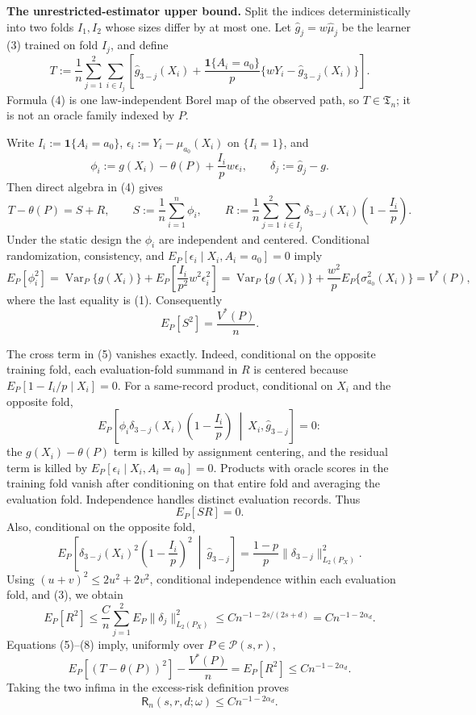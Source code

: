 \textbf{The unrestricted-estimator upper bound.}
Split the indices deterministically into two folds \(I_1,I_2\) whose sizes differ by at most one.  Let \(\widehat g_j=w\widehat\mu_j\) be the learner (3) trained on fold \(I_j\), and define
\[
T:=\frac1n\sum_{j=1}^2\sum_{i\in I_j}
\left[
\widehat g_{3-j}(X_i)
+\frac{\mathbf 1\{A_i=a_0\}}{p}
\{wY_i-\widehat g_{3-j}(X_i)\}
\right].
\tag{4}
\]
Formula (4) is one law-independent Borel map of the observed path, so \(T\in\mathfrak T_n\); it is not an oracle family indexed by \(P\).

Write \(I_i:=\mathbf 1\{A_i=a_0\}\), \(\epsilon_i:=Y_i-\mu_{a_0}(X_i)\) on \(\{I_i=1\}\), and
\[
\phi_i:=g(X_i)-\theta(P)+\frac{I_i}{p}w\epsilon_i,
\qquad
\delta_j:=\widehat g_j-g.
\]
Then direct algebra in (4) gives
\[
T-\theta(P)=S+R,
\qquad
S:=\frac1n\sum_{i=1}^n\phi_i,
\qquad
R:=\frac1n\sum_{j=1}^2\sum_{i\in I_j}
\delta_{3-j}(X_i)\left(1-\frac{I_i}{p}\right).
\tag{5}
\]
Under the static design the \(\phi_i\) are independent and centered.  Conditional randomization, consistency, and \(E_P[\epsilon_i\mid X_i,A_i=a_0]=0\) imply
\[
E_P[\phi_i^2]
=\operatorname{Var}_P\{g(X_i)\}
+E_P\left[\frac{I_i}{p^2}w^2\epsilon_i^2\right]
=\operatorname{Var}_P\{g(X_i)\}
+\frac{w^2}{p}E_P\{\sigma_{a_0}^2(X_i)\}
=V^*(P),
\]
where the last equality is (1).  Consequently
\[
E_P[S^2]=\frac{V^*(P)}{n}.
\tag{6}
\]

The cross term in (5) vanishes exactly.  Indeed, conditional on the opposite training fold, each evaluation-fold summand in \(R\) is centered because \(E_P[1-I_i/p\mid X_i]=0\).  For a same-record product, conditional on \(X_i\) and the opposite fold,
\[
E_P\left[
\phi_i\delta_{3-j}(X_i)\left(1-\frac{I_i}{p}\right)
\ \middle|\ X_i,\widehat g_{3-j}
\right]=0:
\]
the \(g(X_i)-\theta(P)\) term is killed by assignment centering, and the residual term is killed by \(E_P[\epsilon_i\mid X_i,A_i=a_0]=0\).  Products with oracle scores in the training fold vanish after conditioning on that entire fold and averaging the evaluation fold.  Independence handles distinct evaluation records.  Thus
\[
E_P[SR]=0.
\tag{7}
\]
Also, conditional on the opposite fold,
\[
E_P\left[
\delta_{3-j}(X_i)^2\left(1-\frac{I_i}{p}\right)^2
\ \middle|\ \widehat g_{3-j}
\right]
=\frac{1-p}{p}\|\delta_{3-j}\|_{L_2(P_X)}^2.
\]
Using \((u+v)^2\leq2u^2+2v^2\), conditional independence within each evaluation fold, and (3), we obtain
\[
E_P[R^2]
\leq \frac{C}{n}
\sum_{j=1}^2E_P\|\delta_j\|_{L_2(P_X)}^2
\leq Cn^{-1-2s/(2s+d)}
=Cn^{-1-2\alpha_d}.
\tag{8}
\]
Equations (5)--(8) imply, uniformly over \(P\in\mathcal P(s,r)\),
\[
E_P[(T-\theta(P))^2]-\frac{V^*(P)}n
=E_P[R^2]
\leq Cn^{-1-2\alpha_d}.
\]
Taking the two infima in the excess-risk definition proves
\[
\mathsf R_n(s,r,d;\omega)\leq Cn^{-1-2\alpha_d}.
\tag{9}
\]

